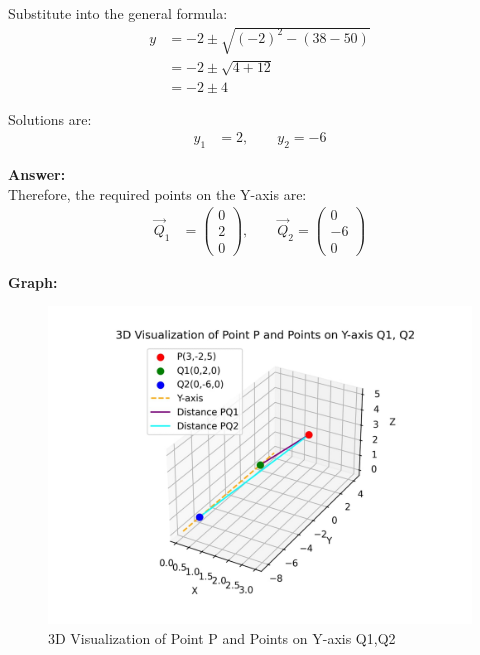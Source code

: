 \documentclass{article}
\begin{document}
Substitute into the general formula:
\begin{align}
y &= -2 \pm \sqrt{(-2)^2 - (38 - 50)} \\
  &= -2 \pm \sqrt{4 + 12} \\
  &= -2 \pm 4
\end{align}

Solutions are:
\begin{align}
y_1 &= 2, \qquad y_2 = -6
\end{align}

\vspace{2mm}
\textbf{Answer:}
\\

Therefore, the required points on the Y-axis are:
\begin{align}
\vec{Q}_1 &= \begin{pmatrix} 0 \\ 2 \\ 0 \end{pmatrix}, \qquad
\vec{Q}_2 = \begin{pmatrix} 0 \\ -6 \\ 0 \end{pmatrix}
\end{align}


\textbf{Graph:}
\begin{figure}[H]
	\centering
	\includegraphics[width=0.8\columnwidth]{FIG/graph.png}
	\caption{3D Visualization of Point P and Points on Y-axis Q1,Q2}
	\label{img}
\end{figure}
\end{document}
